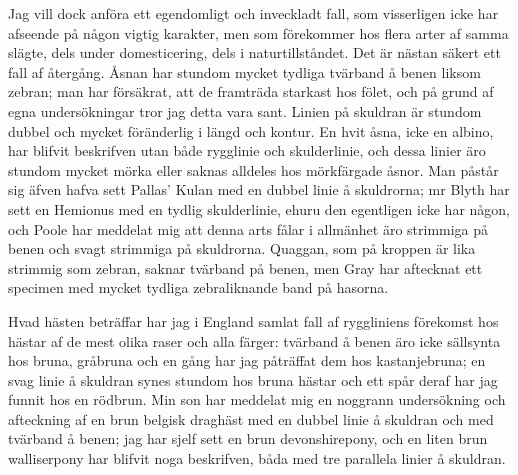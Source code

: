 Jag vill dock anföra ett egendomligt och inveckladt fall, som visserligen icke har afseende på någon vigtig karakter, men som förekommer hos flera arter af samma slägte, dels under domesticering, dels i naturtillståndet. Det är nästan säkert ett fall af återgång. Åsnan har stundom mycket tydliga tvärband å benen liksom zebran; man har försäkrat, att de framträda starkast hos fölet, och på grund af egna undersökningar tror jag detta vara sant. Linien på skuldran är stundom dubbel och mycket föränderlig i längd och kontur. En hvit åsna, icke en albino, har blifvit beskrifven utan både rygglinie och skulderlinie, och dessa linier äro stundom mycket mörka eller saknas alldeles hos mörkfärgade åsnor. Man påstår sig äfven hafva sett Pallas’ Kulan med en dubbel linie å skuldrorna; mr Blyth har sett en Hemionus med en tydlig skulderlinie, ehuru den egentligen icke har någon, och Poole har meddelat mig att denna arts fålar i allmänhet äro strimmiga på benen och svagt strimmiga på skuldrorna. Quaggan, som på kroppen är lika strimmig som zebran, saknar tvärband på benen, men Gray har aftecknat ett specimen med mycket tydliga zebraliknande band på hasorna.

Hvad hästen beträffar har jag i England samlat fall af ryggliniens förekomst hos hästar af de mest olika raser och alla färger: tvärband å benen äro icke sällsynta hos bruna, gråbruna och en gång har jag påträffat dem hos kastanjebruna; en svag linie å skuldran synes stundom hos bruna hästar och ett spår deraf har jag funnit hos en rödbrun. Min son har meddelat mig en noggrann undersökning och afteckning af en brun belgisk draghäst med en dubbel linie å skuldran och med tvärband å benen; jag har sjelf sett en brun devonshirepony, och en liten brun walliserpony har blifvit noga beskrifven, båda med tre parallela linier å skuldran.

